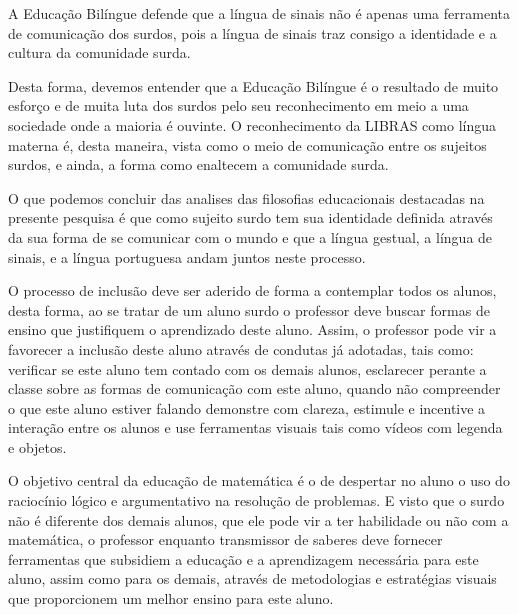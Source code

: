 \documentclass[brasil]{abnt}
\begin{document}
	A Educação Bilíngue defende que a língua de sinais não é apenas uma ferramenta de comunicação dos surdos, pois a língua de sinais traz consigo a identidade e a cultura da comunidade surda. 
	
	Desta forma, devemos entender que a Educação Bilíngue é o resultado de muito esforço e de muita luta dos surdos pelo seu reconhecimento em meio a uma sociedade onde a maioria é ouvinte. O reconhecimento da
	LIBRAS como língua materna é, desta maneira, vista como o meio de comunicação entre os sujeitos surdos, e ainda, a forma como enaltecem a comunidade surda. 
	
	O que podemos concluir das analises das filosofias educacionais destacadas na presente pesquisa é que como sujeito surdo tem sua identidade definida através da sua forma de se comunicar com o mundo e que 
	a língua gestual, a língua de sinais, e a língua portuguesa andam juntos neste processo.     
	
	O processo de inclusão deve ser aderido de forma a contemplar todos os alunos, desta forma, ao se tratar de um aluno surdo o professor deve buscar formas de ensino que justifiquem o aprendizado deste aluno.
	Assim, o professor pode vir a favorecer a inclusão deste aluno através de condutas já adotadas, tais como: verificar se este aluno tem contado com os demais alunos, esclarecer perante a 
	classe sobre as formas de comunicação com este aluno, quando não compreender o que este aluno estiver falando demonstre com clareza, estimule e incentive a interação entre os alunos e use ferramentas 
	visuais tais como vídeos com legenda e objetos.        
	
	O objetivo central da educação de matemática é o de despertar no aluno o uso do raciocínio lógico e argumentativo na resolução de problemas. E visto que o surdo não é diferente dos demais alunos, que ele pode vir a 
	ter habilidade ou não com a matemática, o professor enquanto transmissor de saberes deve fornecer ferramentas que subsidiem a educação e a aprendizagem necessária para este aluno, assim como para os demais, através
	de metodologias e estratégias visuais que proporcionem um melhor ensino para este aluno. 
  
  

	\nocite{audi}
	\nocite{aud}
	\nocite{bev}
	\nocite{bot}
	\nocite{capo}
	\nocite{car}
	\nocite{coch}
	\nocite{cou}
	\nocite{cr}
	\nocite{dada}
	\nocite{Ubi}
	\nocite{amore}
	\nocite{dec}
	\nocite{fa}
	\nocite{fil}
	\nocite{gold}
	\nocite{kub}
	\nocite{lacerd}
	\nocite{lei}
	\nocite{lip}
	\nocite{machado}
	\nocite{PC}
	\nocite{macha}
	\nocite{martins}
	\nocite{mm}
	\nocite{moraes}
	\nocite{mon}
	\nocite{nogu}
	\nocite{nunes}
	\nocite{Wiki}
	\nocite{oliveira}
	\nocite{Almeida}
	\nocite{Paul}
	\nocite{jur}
	\nocite{pei}
	\nocite{crist}
	\nocite{phs}
	\nocite{quas}
	\nocite{qua}
	\nocite{qep}
	\nocite{quads}
	\nocite{rodr}
	\nocite{sado}
	\nocite{Sales}
	\nocite{sal}
	\nocite{san}
	\nocite{coelho}
	\nocite{sp}
	\nocite{ei}
	\nocite{silva}
	\nocite{soares}
	\nocite{sou}
	\nocite{stro}
	\nocite{qes}
	\nocite{vs}
	\nocite{vieira}
    
\end{document}
